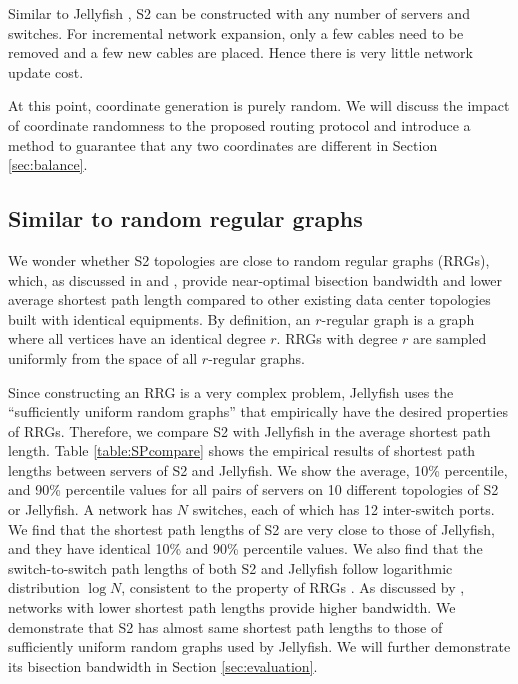 \documentclass[10pt,conference]{IEEEtran}
\begin{document}
Similar to Jellyfish  \cite{Jellyfish}, S2 can be constructed with any number of servers and switches.
For incremental network expansion, only a few cables need to be removed and a few new cables are placed. Hence there is very little network update cost.

At this point, coordinate generation is purely random.
We will discuss the impact of coordinate randomness to the proposed routing protocol and introduce a method to guarantee that any two coordinates are different in Section \ref{sec:balance}.

\subsection{Similar to random regular graphs}
We wonder whether S2 topologies are close to random regular graphs (RRGs), which, as discussed in \cite{Jellyfish} \cite{wang2014similarity} and \cite{Godfrey14}, provide near-optimal bisection bandwidth and lower average shortest path length compared to other existing data center topologies built with identical equipments.
By definition, an $r$-regular graph is a graph where all vertices have an identical degree $r$.
RRGs with degree $r$ are sampled uniformly from the space of all $r$-regular graphs.


Since constructing an RRG is a very complex problem, Jellyfish \cite{Jellyfish} uses the ``sufficiently uniform random graphs'' that empirically have the desired properties of RRGs.
Therefore, we compare S2 with Jellyfish in the average shortest path length.
Table \ref{table:SPcompare} shows the empirical results of shortest path lengths between servers of S2 and Jellyfish.
We show the average, 10\% percentile, and 90\% percentile values for all pairs of servers on 10 different topologies of S2 or Jellyfish.
A network has $N$ switches, each of which has 12 inter-switch ports.
We find that the shortest path lengths of S2 are very close to those of Jellyfish, and they have identical 10\% and 90\% percentile values.
We also find that the  switch-to-switch path lengths of both S2 and Jellyfish follow logarithmic distribution $\log N$, consistent to the property of RRGs \cite{RRGSP}.
As discussed by \cite{Jellyfish}, networks with lower shortest path lengths provide higher bandwidth.
We demonstrate that S2 has almost same shortest path lengths to those of sufficiently uniform random graphs used by Jellyfish.
We will further demonstrate its bisection bandwidth in Section \ref{sec:evaluation}.
\end{document}
